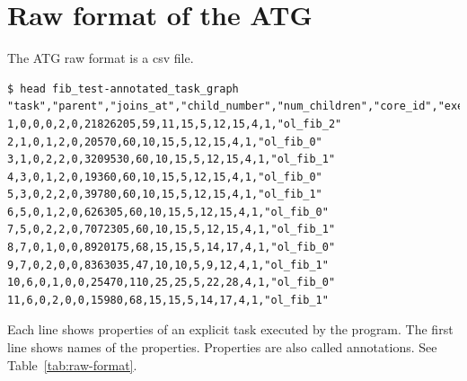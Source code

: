 \documentclass[11pt,a4paper,notitlepage]{article}
\begin{document}
\section{Raw format of the ATG}
The ATG raw format is a csv file.

\begin{lstlisting}[style=BashInputStyle]
$ head fib_test-annotated_task_graph
"task","parent","joins_at","child_number","num_children","core_id","exec_cycles","ins_count","stack_read","stack_write","mem_fp","ccr","clr","mem_read","mem_write","name"
1,0,0,0,2,0,21826205,59,11,15,5,12,15,4,1,"ol_fib_2"
2,1,0,1,2,0,20570,60,10,15,5,12,15,4,1,"ol_fib_0"
3,1,0,2,2,0,3209530,60,10,15,5,12,15,4,1,"ol_fib_1"
4,3,0,1,2,0,19360,60,10,15,5,12,15,4,1,"ol_fib_0"
5,3,0,2,2,0,39780,60,10,15,5,12,15,4,1,"ol_fib_1"
6,5,0,1,2,0,626305,60,10,15,5,12,15,4,1,"ol_fib_0"
7,5,0,2,2,0,7072305,60,10,15,5,12,15,4,1,"ol_fib_1"
8,7,0,1,0,0,8920175,68,15,15,5,14,17,4,1,"ol_fib_0"
9,7,0,2,0,0,8363035,47,10,10,5,9,12,4,1,"ol_fib_1"
10,6,0,1,0,0,25470,110,25,25,5,22,28,4,1,"ol_fib_0"
11,6,0,2,0,0,15980,68,15,15,5,14,17,4,1,"ol_fib_1"
\end{lstlisting}

Each line shows properties of an explicit task executed by the program.
The first line shows names of the properties. 
Properties are also called annotations.
See Table~\ref{tab:raw-format}.
\end{document}
